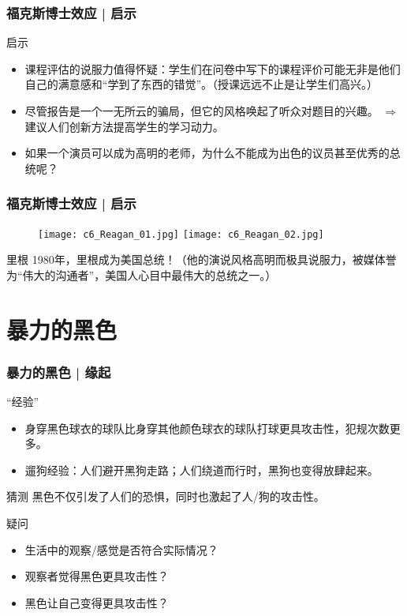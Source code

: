 \begin{frame}
  \frametitle{福克斯博士效应 | 启示}
  \begin{block}{启示}
    \begin{itemize}
      \item \alert{课程评估的说服力值得怀疑}：学生们在问卷中写下的课程评价可能无非是他们自己的满意感和“学到了东西的错觉”。（授课远远不止是让学生们高兴。）
      \item 尽管报告是一个一无所云的骗局，但它的风格唤起了听众对题目的兴趣。 $\Longrightarrow$ 建议人们\alert{创新方法提高学生的学习动力}。
      \item 如果一个演员可以成为高明的老师，为什么不能成为出色的议员甚至优秀的总统呢？
    \end{itemize}
  \end{block}
\end{frame}

\begin{frame}
  \frametitle{福克斯博士效应 | 启示}
  \begin{figure}
    \centering
    \texttt{[image: c6\_Reagan\_01.jpg]}\quad
    \texttt{[image: c6\_Reagan\_02.jpg]}
  \end{figure}
  \pause
  \begin{block}{里根}
 1980年，里根成为美国总统！（他的演说风格高明而极具说服力，被媒体誉为“伟大的沟通者”，美国人心目中最伟大的总统之一。） 
  \end{block}
\end{frame}

\section{暴力的黑色}
\begin{frame}
  \frametitle{暴力的黑色 | 缘起}
  \begin{block}{“经验”}
    \begin{itemize}
      \item 身穿黑色球衣的球队比身穿其他颜色球衣的球队打球更具攻击性，犯规次数更多。
      \item 遛狗经验：人们避开黑狗走路；人们绕道而行时，黑狗也变得放肆起来。
    \end{itemize}
  \end{block}
  \pause
  \begin{block}{猜测}
    黑色不仅引发了人们的恐惧，同时也激起了人/狗的攻击性。
  \end{block}
  \pause
  \begin{block}{疑问}
    \begin{itemize}
      \item 生活中的观察/感觉是否符合实际情况？
      \item 观察者觉得黑色更具攻击性？
      \item 黑色让自己变得更具攻击性？
    \end{itemize}
  \end{block}
\end{frame}

